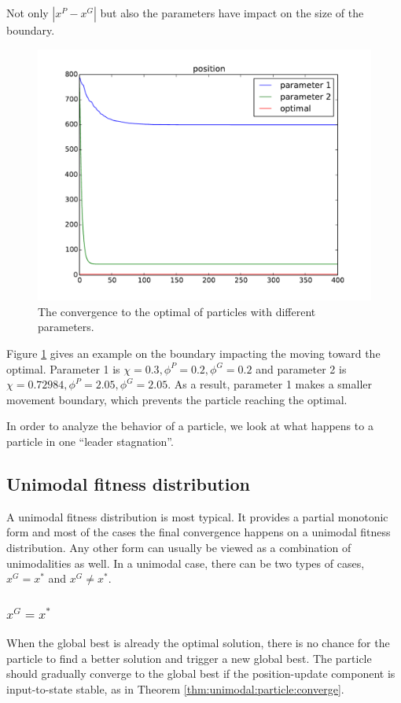 Not only $ | x^{P} - x^{G} | $ but also the parameters have impact on the size of the boundary.

\begin{figure}[tbph]
\centering
\includegraphics[width=0.7\linewidth]{./simfig/bound/bound_position}
\caption{The convergence to the optimal of particles with different parameters.}
\label{fig:bound_position}
\end{figure}

Figure \ref{fig:bound_position} gives an example on the boundary impacting the moving toward the optimal.
Parameter 1 is $ \chi = 0.3, \phi^{P} = 0.2, \phi^{G} = 0.2 $ and parameter 2 is $ \chi = 0.72984, \phi^{P} = 2.05, \phi^{G} = 2.05 $.
As a result, parameter 1 makes a smaller movement boundary, which prevents the particle reaching the optimal.

In order to analyze the behavior of a particle, we look at what happens to a particle in one ``leader stagnation''. 

\subsection{Unimodal fitness distribution}

A unimodal fitness distribution is most typical.
It provides a partial monotonic form and most of the cases the final convergence happens on a unimodal fitness distribution.
Any other form can usually be viewed as a combination of unimodalities as well.
In a unimodal case, there can be two types of cases, $ x^{G} = x^{*} $ and $ x^{G} \not = x^{*} $.

\subsubsection{$ x^{G} = x^{*} $}

When the global best is already the optimal solution, there is no chance for the particle to find a better solution and trigger a new global best.
The particle should gradually converge to the global best if the position-update component is input-to-state stable, as in Theorem \ref{thm:unimodal:particle:converge}.

